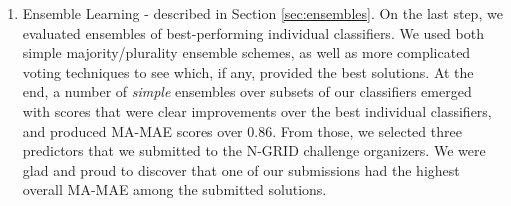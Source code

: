 \begin{enumerate}
 \item \textsf{Ensemble Learning} - described in Section \ref{sec:ensembles}. On the
 last step, we evaluated ensembles of best-performing individual classifiers. 
 We used both simple majority/plurality ensemble schemes, as well as more complicated voting
techniques to see which, if any, provided the best solutions.
At the end, a number of \textit{simple} ensembles over subsets of our classifiers emerged with scores
that were clear improvements over the best  individual classifiers, and produced \textsf{MA-MAE} scores over 0.86.  From those, we selected three predictors that we submitted
to the N-GRID  challenge organizers.  
We were glad and proud to discover that one of our submissions had the
highest overall \textsf{MA-MAE} among the submitted solutions.
\end{enumerate}

